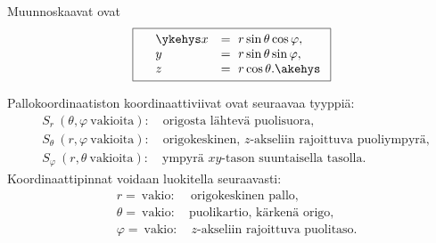Muunnoskaavat ovat
\[
\boxed{\quad
\begin{array}{ll}
\ykehys x &= \ r \sin{\theta} \cos{\varphi}, \quad \\
        y &= \ r \sin{\theta} \sin{\varphi}, \\
        z &= \ r \cos{\theta}. \akehys
\end{array}
}
\]

Pallokoordinaatiston koordinaattiviivat ovat seuraavaa tyyppiä:
\begin{align*}
&S_r\ (\theta,\varphi\ \text{vakioita}): \quad \text{origosta lähtevä puolisuora}, \\
&S_\theta\ (r,\varphi\ \text{vakioita}):  \quad \text{origokeskinen, $z$-akseliin rajoittuva
                                                                              puoliympyrä}, \\
&S_\varphi\ (r,\theta\ \text{vakioita}): \quad \text{ympyrä $xy$-tason suuntaisella tasolla}.
\end{align*}
Koordinaattipinnat voidaan luokitella seuraavasti:
\begin{align*}
&r=\ \text{vakio}:       \quad\, \text{origokeskinen pallo}, \\
&\theta=\ \text{vakio}:  \quad   \text{puolikartio, kärkenä origo}, \\
&\varphi=\ \text{vakio}: \quad   \text{$z$-akseliin rajoittuva puolitaso}.
\end{align*}

